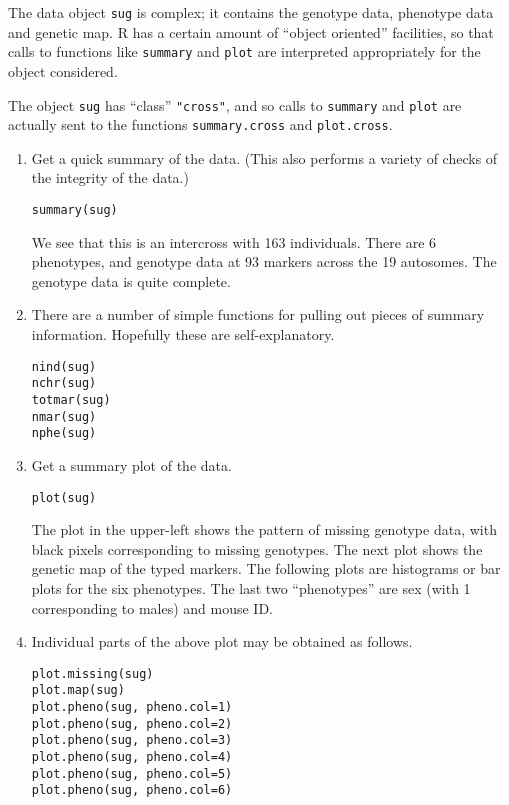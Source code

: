 \documentclass[10pt,letterpaper]{article}
\newcommand{\usercolor}{\color [named]{BlueViolet}}
\begin{document}
The data object \verb-sug- is complex; it contains the genotype
data, phenotype data and genetic map.  R has a certain amount of
``object oriented'' facilities, so that calls to functions like
\verb-summary- and \verb-plot- are interpreted appropriately for the object
considered.  

The object \verb-sug- has ``class'' \verb-"cross"-, and so calls to
\verb-summary- and \verb-plot- are actually sent to the functions
\verb-summary.cross- and \verb-plot.cross-.

\begin{enumerate}
\addtocounter{enumi}{6}
\item Get a quick summary of the data.  (This also performs a variety
  of checks of the integrity of the data.)

\usercolor
\verb|summary(sug)|
\normalcolor

We see that this is an intercross with 163 individuals.  There are 6
phenotypes, and genotype data at 93 markers across the 19 autosomes.
The genotype data is quite complete.

\item There are a number of simple functions for pulling out pieces of summary
  information.  Hopefully these are self-explanatory.

\usercolor
\verb|nind(sug)| \\
\verb|nchr(sug)| \\
\verb|totmar(sug)| \\
\verb|nmar(sug)| \\
\verb|nphe(sug)|
\normalcolor



\item Get a summary plot of the data.

\usercolor
\verb|plot(sug)|
\normalcolor

The plot in the upper-left shows the pattern of missing genotype data, with
black pixels corresponding to missing genotypes.  The next plot shows
the genetic map of the typed markers.  The following plots are
histograms or bar plots for the six phenotypes.  The last two
``phenotypes'' are sex (with 1 corresponding to males) and mouse ID.


\item Individual parts of the above plot may be obtained as follows.

\usercolor
\verb|plot.missing(sug)| \\
\verb|plot.map(sug)| \\
\verb|plot.pheno(sug, pheno.col=1)| \\
\verb|plot.pheno(sug, pheno.col=2)| \\
\verb|plot.pheno(sug, pheno.col=3)| \\
\verb|plot.pheno(sug, pheno.col=4)| \\
\verb|plot.pheno(sug, pheno.col=5)| \\
\verb|plot.pheno(sug, pheno.col=6)|
\normalcolor


\end{enumerate}
\end{document}
